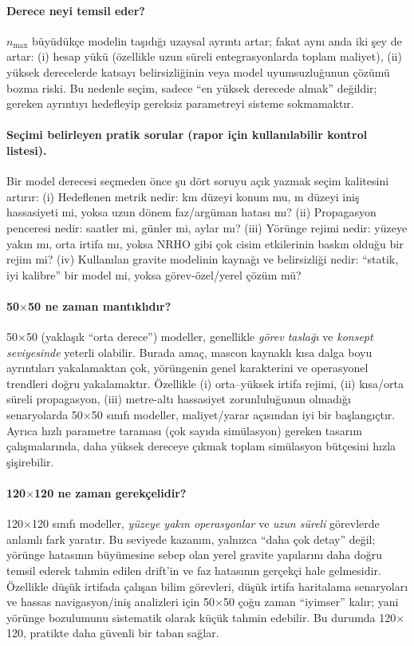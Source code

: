 \paragraph{Derece neyi temsil eder?}
$n_{\max}$ büyüdükçe modelin taşıdığı uzaysal ayrıntı artar; fakat aynı anda iki şey de artar:
(i) hesap yükü (özellikle uzun süreli entegrasyonlarda toplam maliyet),
(ii) yüksek derecelerde katsayı belirsizliğinin veya model uyumsuzluğunun çözümü bozma riski.
Bu nedenle seçim, sadece ``en yüksek derecede almak'' değildir; gereken ayrıntıyı hedefleyip
gereksiz parametreyi sisteme sokmamaktır.

\paragraph{Seçimi belirleyen pratik sorular (rapor için kullanılabilir kontrol listesi).}
Bir model derecesi seçmeden önce şu dört soruyu açık yazmak seçim kalitesini artırır:
(i) Hedeflenen metrik nedir: km düzeyi konum mu, m düzeyi iniş hassasiyeti mi, yoksa uzun dönem faz/argüman hatası mı?
(ii) Propagasyon penceresi nedir: saatler mi, günler mi, aylar mı?
(iii) Yörünge rejimi nedir: yüzeye yakın mı, orta irtifa mı, yoksa NRHO gibi çok cisim etkilerinin baskın olduğu bir rejim mi?
(iv) Kullanılan gravite modelinin kaynağı ve belirsizliği nedir: ``statik, iyi kalibre'' bir model mi, yoksa görev-özel/yerel çözüm mü?

\paragraph{50$\times$50 ne zaman mantıklıdır?}
50$\times$50 (yaklaşık ``orta derece'') modeller, genellikle \emph{görev taslağı} ve \emph{konsept seviyesinde}
yeterli olabilir. Burada amaç, mascon kaynaklı kısa dalga boyu ayrıntıları yakalamaktan çok,
yörüngenin genel karakterini ve operasyonel trendleri doğru yakalamaktır. Özellikle
(i) orta--yüksek irtifa rejimi, (ii) kısa/orta süreli propagasyon, (iii) metre-altı hassasiyet zorunluluğunun olmadığı
senaryolarda 50$\times$50 sınıfı modeller, maliyet/yarar açısından iyi bir başlangıçtır.
Ayrıca hızlı parametre taraması (çok sayıda simülasyon) gereken tasarım çalışmalarında,
daha yüksek dereceye çıkmak toplam simülasyon bütçesini hızla şişirebilir.

\paragraph{120$\times$120 ne zaman gerekçelidir?}
120$\times$120 sınıfı modeller, \emph{yüzeye yakın operasyonlar} ve \emph{uzun süreli} görevlerde anlamlı fark yaratır.
Bu seviyede kazanım, yalnızca ``daha çok detay'' değil; yörünge hatasının büyümesine sebep olan yerel gravite yapılarını
daha doğru temsil ederek tahmin edilen drift'in ve faz hatasının gerçekçi hale gelmesidir.
Özellikle düşük irtifada çalışan bilim görevleri, düşük irtifa haritalama senaryoları ve hassas navigasyon/iniş analizleri
için 50$\times$50 çoğu zaman ``iyimser'' kalır; yani yörünge bozulumunu sistematik olarak küçük tahmin edebilir.
Bu durumda 120$\times$120, pratikte daha güvenli bir taban sağlar.

